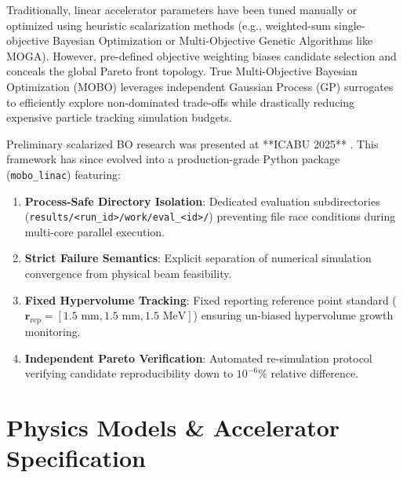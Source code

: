 \documentclass[11pt,a4paper]{article}
\begin{document}
Traditionally, linear accelerator parameters have been tuned manually or optimized using heuristic scalarization methods (e.g., weighted-sum single-objective Bayesian Optimization or Multi-Objective Genetic Algorithms like MOGA). However, pre-defined objective weighting biases candidate selection and conceals the global Pareto front topology. True Multi-Objective Bayesian Optimization (MOBO) leverages independent Gaussian Process (GP) surrogates to efficiently explore non-dominated trade-offs while drastically reducing expensive particle tracking simulation budgets.

Preliminary scalarized BO research was presented at **ICABU 2025** \cite{ICABU2025}. This framework has since evolved into a production-grade Python package (\texttt{mobo\_linac}) featuring:
\begin{enumerate}
    \item \textbf{Process-Safe Directory Isolation}: Dedicated evaluation subdirectories (\texttt{results/<run\_id>/work/eval\_<id>/}) preventing file race conditions during multi-core parallel execution.
    \item \textbf{Strict Failure Semantics}: Explicit separation of numerical simulation convergence from physical beam feasibility.
    \item \textbf{Fixed Hypervolume Tracking}: Fixed reporting reference point standard ($\mathbf{r}_{\text{rep}} = [1.5\text{ mm}, 1.5\text{ mm}, 1.5\text{ MeV}]$) ensuring un-biased hypervolume growth monitoring.
    \item \textbf{Independent Pareto Verification}: Automated re-simulation protocol verifying candidate reproducibility down to $10^{-6}\%$ relative difference.
\end{enumerate}

\section{Physics Models \& Accelerator Specification}
\label{sec:physics}
\end{document}
